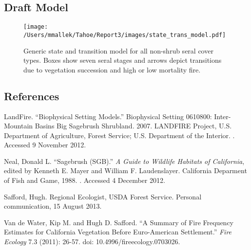 \subsection*{Draft Model}
\begin{figure}[htbp]
\centering
\texttt{[image: /Users/mmallek/Tahoe/Report3/images/state\_trans\_model.pdf]}
\caption{Generic state and transition model for all non-shrub seral cover types. Boxes show seven seral stages and arrows depict transitions due to vegetation succession and high or low mortality fire.} 
\label{sage_transmodel}
\end{figure}

\clearpage
\subsection*{References}
\begin{hangparas}{.25in}{1} 
LandFire. ``Biophysical Setting Models.'' Biophysical Setting 0610800: Inter-Mountain Basins Big Sagebrush Shrubland. 2007. LANDFIRE Project, U.S. Department of Agriculture, Forest Service; U.S. Department of the Interior. . Accessed 9 November 2012.

Neal, Donald L. ``Sagebrush (SGB).'' \emph{A Guide to Wildlife Habitats of California}, edited by Kenneth E. Mayer and William F. Laudenslayer. California Deparment of Fish and Game, 1988. . Accessed 4 December 2012.

Safford, Hugh. Regional Ecologist, USDA Forest Service. Personal communication, 15 August 2013.

Van de Water, Kip M. and Hugh D. Safford. ``A Summary of Fire Frequency Estimates for California Vegetation Before Euro-American Settlement.'' \emph{Fire Ecology} 7.3 (2011): 26-57. doi: 10.4996/fireecology.0703026.
\end{hangparas}

